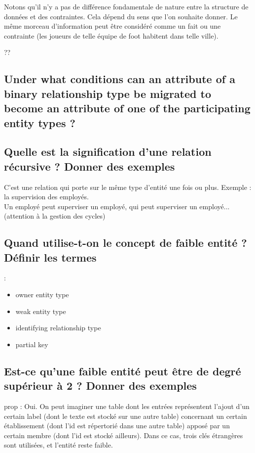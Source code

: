 Notons qu'il n'y a pas de différence fondamentale  de nature entre la structure de données et des contraintes. Cela dépend du sens que l'on souhaite donner.
Le même morceau d'information peut être considéré comme un fait ou une contrainte 
(les joueurs de telle équipe de foot habitent dans telle ville).

??
\subsection{Under what conditions can an attribute of a binary relationship type be migrated to become an attribute of one of the participating entity types ?}


\subsection{Quelle est la signification d'une relation récursive ? Donner des exemples}
C'est une relation qui porte sur le même type d'entité une fois ou plus.
Exemple : la supervision des employés. \\
Un employé peut superviser un employé, qui peut superviser un employé... (attention à la gestion des cycles)\\

\subsection{Quand utilise-t-on le concept de faible entité ? Définir les termes} :
\begin{itemize}
	\item owner entity type
	\item weak entity type
	\item identifying relationship type
	\item partial key
\end{itemize}

\subsection{Est-ce qu'une faible entité peut être de degré supérieur à 2 ? Donner des exemples}
prop :
Oui. On peut imaginer une table dont les entrées représentent l'ajout d'un certain label (dont le texte est stocké sur une autre table) 
concernant un certain établissement (dont l'id est répertorié dans une autre table) apposé par un certain membre 
(dont l'id est stocké ailleurs). Dans ce cas, 
trois clés étrangères sont utilisées, et l'entité reste faible.

